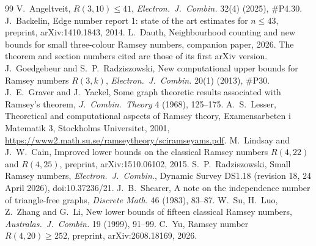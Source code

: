 \documentclass[11pt]{article}
\theoremstyle{spacedplain}
\theoremstyle{spaceddef}
\theoremstyle{spacedremark}
\begin{document}
\begin{thebibliography}{99}\small
{} V.~Angeltveit, $R(3,10)\le 41$, \emph{Electron.\ J.\ Combin.} 32(4) (2025), \#P4.30.
 J.~Backelin, Edge number report 1: state of the art estimates for $n\le 43$, preprint, arXiv:1410.1843, 2014.
 L.~Dauth, Neighbourhood counting and new bounds for small three-colour Ramsey numbers, companion paper, 2026. The theorem and section numbers cited are those of its first arXiv version.
 J.~Goedgebeur and S.~P.~Radziszowski, New computational upper bounds for Ramsey numbers $R(3,k)$, \emph{Electron.\ J.\ Combin.} 20(1) (2013), \#P30.
 J.~E.~Graver and J.~Yackel, Some graph theoretic results associated with Ramsey's theorem, \emph{J.\ Combin.\ Theory} 4 (1968), 125--175.
 A.~S.~Lesser, Theoretical and computational aspects of Ramsey theory, Examensarbeten i Matematik 3, Stockholms Universitet, 2001, \url{https://www2.math.su.se/ramseytheory/sciramseyams.pdf}.
 M.~Lindsay and J.~W.~Cain, Improved lower bounds on the classical Ramsey numbers $R(4,22)$ and $R(4,25)$, preprint, arXiv:1510.06102, 2015.
 S.~P.~Radziszowski, Small Ramsey numbers, \emph{Electron.\ J.\ Combin.}, Dynamic Survey DS1.18 (revision 18, 24 April 2026), doi:10.37236/21.
 J.~B.~Shearer, A note on the independence number of triangle-free graphs, \emph{Discrete Math.} 46 (1983), 83--87.
 W.~Su, H.~Luo, Z.~Zhang and G.~Li, New lower bounds of fifteen classical Ramsey numbers, \emph{Australas.\ J.\ Combin.} 19 (1999), 91--99.
 C.~Yu, Ramsey number $R(4,20)\ge 252$, preprint, arXiv:2608.18169, 2026.
\end{thebibliography}
\end{document}
